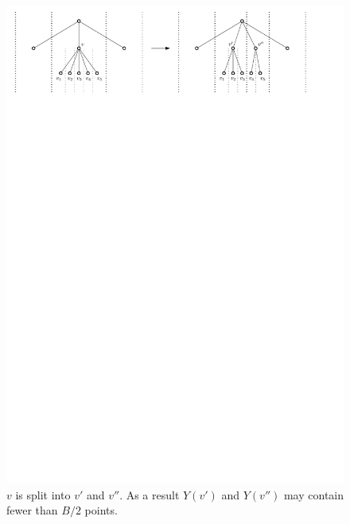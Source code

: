 \documentclass[twoside,11pt,openright]{report}
\begin{document}
\begin{figure}[h]
	\centering
     \includegraphics[width=\textwidth]{../figures/arge_split}
     \caption{$v$ is split into $v'$ and $v''$. As a result $Y(v')$ and $Y(v'')$ may contain fewer than $B/2$ points.}
     \label{fig:arge_split_1}
\end{figure}
\end{document}
